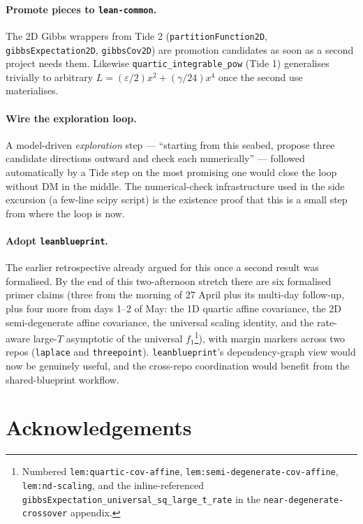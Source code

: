\documentclass[11pt]{article}
\begin{document}
\paragraph{Promote pieces to \texttt{lean-common}.} The 2D Gibbs
wrappers from Tide 2 (\texttt{partitionFunction2D},
\texttt{gibbsExpectation2D}, \texttt{gibbsCov2D}) are promotion
candidates as soon as a second project needs them. Likewise
\texttt{quartic\_integrable\_pow} (Tide 1) generalises trivially to
arbitrary $L = (\varepsilon/2)x^2 + (\gamma/24) x^4$ once the second
use materialises.

\paragraph{Wire the exploration loop.} A model-driven
\emph{exploration} step --- ``starting from this seabed, propose three
candidate directions outward and check each numerically'' --- followed
automatically by a Tide step on the most promising one would close the
loop without DM in the middle. The numerical-check infrastructure used
in the side excursion (a few-line scipy script) is the existence
proof that this is a small step from where the loop is now.

\paragraph{Adopt \texttt{leanblueprint}.} The earlier retrospective
already argued for this once a second result was formalised. By the
end of this two-afternoon stretch there are six formalised primer
claims (three from the morning of 27 April plus its multi-day
follow-up, plus four more from days 1--2 of May: the 1D quartic affine
covariance, the 2D semi-degenerate affine covariance, the universal
scaling identity, and the rate-aware large-$T$ asymptotic of the
universal $f_1$\footnote{Numbered
\texttt{lem:quartic-cov-affine}, \texttt{lem:semi-degenerate-cov-affine},
\texttt{lem:nd-scaling}, and the inline-referenced
\texttt{gibbsExpectation\_universal\_sq\_large\_t\_rate} in the
\texttt{near-degenerate-crossover} appendix.}), with margin markers
across two repos (\texttt{laplace} and \texttt{threepoint}).
\texttt{leanblueprint}'s dependency-graph view would now be genuinely
useful, and the cross-repo coordination would benefit from the
shared-blueprint workflow.

\section{Acknowledgements}
\end{document}
